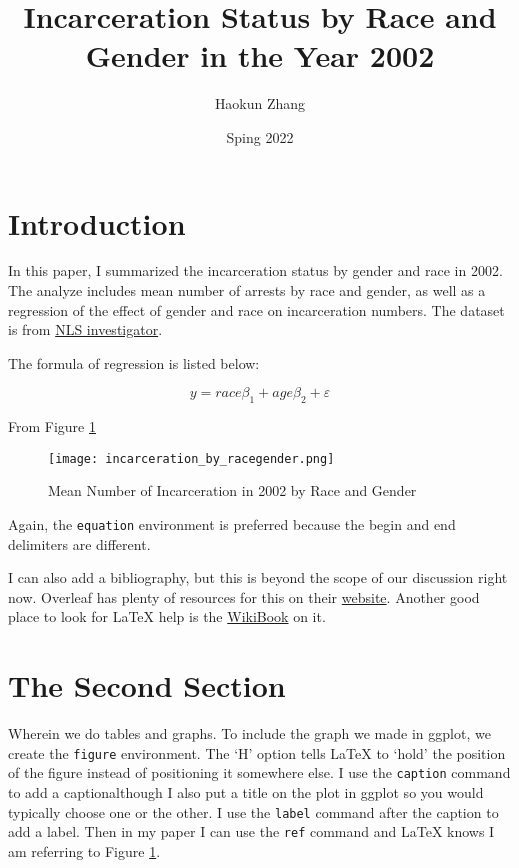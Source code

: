 \documentclass{article}
\author{Haokun Zhang}
\title{Incarceration Status by Race and Gender in the Year 2002}
\date{Sping 2022}
\begin{document}
\maketitle

\section{Introduction}

In this paper, I summarized the incarceration status by gender and race in 2002. The analyze includes mean number of arrests by race and gender, as well as a regression of the effect of gender and race on incarceration numbers. The dataset is from \href{https://www.nlsinfo.org/investigator/pages/search}{NLS investigator}.

The formula of regression is listed below:

$$
    y = {race}\beta_1 +  {age\beta_2} + \varepsilon
$$

From Figure \ref{arrests_by_racegender} 

\begin{figure}[H]
    \begin{center}
        \texttt{[image: incarceration\_by\_racegender.png]}
    \end{center}
    \caption{Mean Number of Incarceration in 2002 by Race and Gender}
    \label{arrests_by_racegender}
\end{figure}



Again, the \texttt{equation} environment is preferred because the begin and end delimiters are different.

I can also add a bibliography, but this is beyond the scope of our discussion right now. Overleaf has plenty of resources for this on their \href{https://www.overleaf.com/learn}{website}. Another good place to look for LaTeX help is the \href{https://en.wikibooks.org/wiki/LaTeX}{WikiBook} on it.

\newpage

\section{The Second Section}

Wherein we do tables and graphs. To include the graph we made in ggplot, we create the \texttt{figure} environment. The `H' option tells LaTeX to `hold' the position of the figure instead of positioning it somewhere else. I use the \texttt{caption} command to add a caption{\textemdash}although I also put a title on the plot in ggplot so you would typically choose one or the other. I use the \texttt{label} command after the caption to add a label. Then in my paper I can use the \texttt{ref} command and LaTeX knows I am referring to Figure \ref{arrests_by_racegender}.
\end{document}
